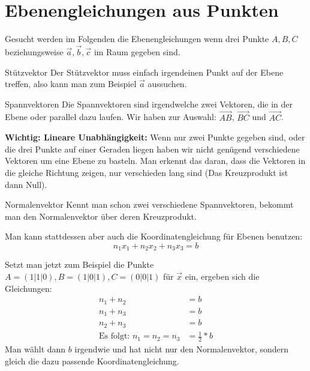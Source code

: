 \section{Ebenengleichungen aus Punkten}
Gesucht werden im Folgenden die Ebenengleichungen wenn drei Punkte $A,B,C$ beziehungsweise $\vec{a}, \vec{b}, \vec{c}$ im Raum gegeben sind.

\begin{bla}{Stützvektor}
  Der Stützvektor muss einfach irgendeinen Punkt auf der Ebene treffen, also kann man zum Beispiel $\vec{a}$ aussuchen.
\end{bla}

\begin{bla}{Spannvektoren}
  Die Spannvektoren sind irgendwelche zwei Vektoren, die in der Ebene oder parallel dazu laufen. Wir haben zur Auswahl: $\overrightarrow{AB}$, $\overrightarrow{BC}$ und $\overrightarrow{AC}$.

  \textbf{Wichtig: Lineare Unabhängigkeit:} Wenn nur zwei Punkte gegeben sind, oder die drei Punkte auf einer Geraden liegen haben wir nicht genügend verschiedene Vektoren um eine Ebene zu basteln.
  Man erkennt das daran, dass die Vektoren in die gleiche Richtung zeigen, nur verschieden lang sind
  (Das Kreuzprodukt ist dann Null).
\end{bla}

\begin{bla}{Normalenvektor}
  Kennt man schon zwei verschiedene Spannvektoren, bekommt man den Normalenvektor über deren Kreuzprodukt.

  Man kann stattdessen aber auch die Koordinatengleichung für Ebenen benutzen:
  \begin{equation*}
    n_1x_1 + n_2x_2 + n_3x_3 = b
  \end{equation*}



  Setzt man jetzt zum Beispiel die Punkte $A=(1|1|0), B=(1|0|1), C=(0|0|1)$ für $\vec{x}$ ein, ergeben sich die Gleichungen:
  \begin{align*}
    n_1 + n_2 &= b \\
    n_1 + n_3 &= b \\
    n_2 + n_3 &= b \\
    \text{Es folgt: } n_1 = n_2 = n_3 &= \frac{1}{2} * b
  \end{align*}
  Man wählt dann $b$ irgendwie und hat nicht nur den Normalenvektor, sondern gleich die dazu passende Koordinatengleichung.
\end{bla}

